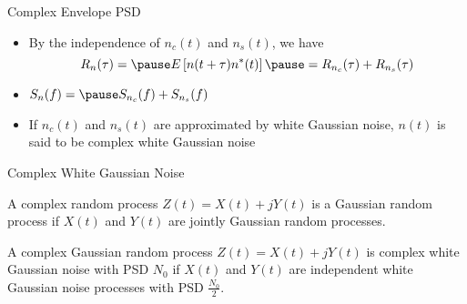 \documentclass[t]{beamer}
\begin{document}
\begin{frame}{Complex Envelope PSD}
  \footnotesize
  \begin{itemize}
    \item \pause By the independence of $n_c(t)$ and $n_s(t)$, we have
      \begin{equation*}
        R_{n}(\tau) = \pause E\left[ n(t+\tau)n^*(t)\right] \pause = R_{n_c}(\tau) + R_{n_s}(\tau)
      \end{equation*}
    \item \pause $S_n(f) = \pause S_{n_c}(f) + S_{n_s}(f)$
  \end{itemize}
  \pause
  \begin{figure}
    \centering
  \end{figure}
  \begin{itemize}
    \item \pause If $n_c(t)$ and $n_s(t)$ are approximated by white Gaussian noise, $n(t)$ is said to be complex white Gaussian noise
  \end{itemize}
  \normalsize
\end{frame}

\begin{frame}{Complex White Gaussian Noise}
  \footnotesize
  \pause
  \begin{definition}
    A complex random process $Z(t) = X(t) + jY(t)$ is a Gaussian random process if $X(t)$ and $Y(t)$ are jointly Gaussian random processes.
  \end{definition}
  \pause
  \begin{definition}
    A complex Gaussian random process $Z(t) = X(t) + jY(t)$ is complex white Gaussian noise with PSD $N_0$ if $X(t)$ and $Y(t)$ are independent white Gaussian noise processes with PSD $\frac{N_0}{2}$.
  \end{definition}
  \normalsize
\end{frame}
\end{document}
